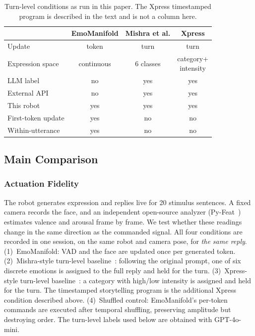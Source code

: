 \documentclass[letterpaper, 10 pt, conference]{ieeeconf/ieeeconf}
\begin{document}
\begin{table}[t]
    \caption{Turn-level conditions as run in this paper. The Xpress timestamped program is described in the text and is not a column here.}
    \label{tab:design}
    \centering
    \begin{tabular}{@{}lccc@{}}
    \toprule
     & EmoManifold & Mishra et al. & Xpress \\
    \midrule
    Update & token & turn & turn \\
    Expression space & continuous & 6 classes & \shortstack{category+\\intensity} \\
    LLM label & no & yes & yes \\
    External API & no & yes & yes \\
    This robot & yes & yes & yes \\
    First-token update & yes & no & no \\
    Within-utterance & yes & no & no \\
    \bottomrule
    \end{tabular}
\end{table}

\subsection{Main Comparison}
\label{sec:exp_hardware}

\subsubsection{Actuation Fidelity}
The robot generates expression and replies live for 20 stimulus sentences. A fixed camera records the face, and an independent open-source analyzer (Py-Feat~\cite{cheong2023pyfeat}) estimates valence and arousal frame by frame. We test whether these readings change in the same direction as the commanded signal. All four conditions are recorded in one session, on the same robot and camera pose, for \emph{the same reply}. (1)~EmoManifold: VAD and the face are updated once per generated token. (2)~Mishra-style turn-level baseline~\cite{mishra2023realtime}: following the original prompt, one of six discrete emotions is assigned to the full reply and held for the turn. (3)~Xpress-style turn-level baseline~\cite{antony2025xpress}: a category with high/low intensity is assigned and held for the turn. The timestamped storytelling program is the additional Xpress condition described above. (4)~Shuffled control: EmoManifold's per-token commands are executed after temporal shuffling, preserving amplitude but destroying order. The turn-level labels used below are obtained with GPT-4o-mini.
\end{document}
